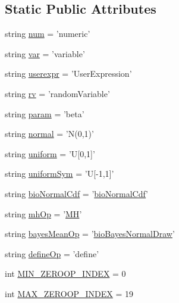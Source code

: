 \subsection*{Static Public Attributes}
\begin{DoxyCompactItemize}
\item 
string \hyperlink{classbio__expression_1_1_operator_a9218912b24cbbf93ec6437f8fcb7425b}{num} = 'numeric'
\item 
string \hyperlink{classbio__expression_1_1_operator_a57e66dc86a1f2dc1b445de72cb6b5ae3}{var} = 'variable'
\item 
string \hyperlink{classbio__expression_1_1_operator_a36db50b667d12009b2416d75f867e812}{userexpr} = 'User\+Expression'
\item 
string \hyperlink{classbio__expression_1_1_operator_a75ff5560af6c3a51cdb1e081c43c5307}{rv} = 'random\+Variable'
\item 
string \hyperlink{classbio__expression_1_1_operator_a65fbaabbd4d58d42b0dfcf289dc471a7}{param} = 'beta'
\item 
string \hyperlink{classbio__expression_1_1_operator_afa09011c1c34b89d546c13770a2cfe41}{normal} = 'N(0,1)'
\item 
string \hyperlink{classbio__expression_1_1_operator_a7dbfc1dc2e494f3e2b223009d9da589d}{uniform} = 'U\mbox{[}0,1\mbox{]}'
\item 
string \hyperlink{classbio__expression_1_1_operator_af0fdc1f7125448dd8f87c775b4e92bc0}{uniform\+Sym} = 'U\mbox{[}-\/1,1\mbox{]}'
\item 
string \hyperlink{classbio__expression_1_1_operator_a7e1eb8e6000edd55e5e9db7f4fb2c65b}{bio\+Normal\+Cdf} = '\hyperlink{classbio__expression_1_1bio_normal_cdf}{bio\+Normal\+Cdf}'
\item 
string \hyperlink{classbio__expression_1_1_operator_a34050786a36ab06632249277eb27b84c}{mh\+Op} = '\hyperlink{classbio__expression_1_1_m_h}{M\+H}'
\item 
string \hyperlink{classbio__expression_1_1_operator_a482c5c114fe61acfb6d94d8de4fe73ab}{bayes\+Mean\+Op} = '\hyperlink{classbio__expression_1_1bio_bayes_normal_draw}{bio\+Bayes\+Normal\+Draw}'
\item 
string \hyperlink{classbio__expression_1_1_operator_a697c8f61e4d58a600f19d613e98ba9a8}{define\+Op} = 'define'
\item 
int \hyperlink{classbio__expression_1_1_operator_a261a3955ad077daed9f2e80b31e2bddc}{M\+I\+N\+\_\+\+Z\+E\+R\+O\+O\+P\+\_\+\+I\+N\+D\+E\+X} = 0
\item 
int \hyperlink{classbio__expression_1_1_operator_a47efbd1f29c35b911e126f339ca4756f}{M\+A\+X\+\_\+\+Z\+E\+R\+O\+O\+P\+\_\+\+I\+N\+D\+E\+X} = 19

\end{DoxyCompactItemize}

